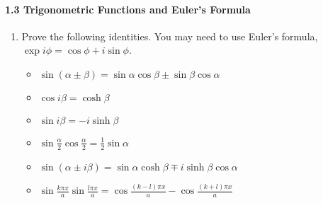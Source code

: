 \documentclass{chem6155problemset}
\begin{document}
\paragraph{1.3 Trigonometric Functions and Euler's Formula}
\begin{enumerate}[resume]

\item Prove the following identities. You may need to use Euler's formula, $\exp i\phi = \cos\phi + i \sin\phi$.
	\begin{itemize}
		\item $\sin(\alpha\pm\beta) = \sin\alpha\cos\beta \pm \sin\beta\cos\alpha$
		\item $\cos i\beta = \cosh\beta$
		\item $\sin i\beta = -i \sinh\beta$
		\item $\sin\frac{\alpha}{2}\cos\frac\alpha{2} = \frac{1}{2}\sin\alpha$
		\item $\sin(\alpha\pm i\beta) = \sin\alpha\cosh\beta \mp i \sinh\beta\cos\alpha$
		\item $\sin\frac{k\pi x}{a}\sin\frac{l\pi x}{a} = \cos\frac{(k-l)\pi x}{a} - \cos\frac{(k+l)\pi x}{a}$
	\end{itemize}

\end{enumerate}
\end{document}
